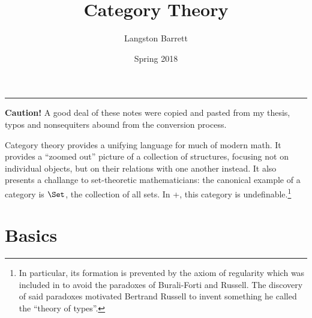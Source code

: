 \documentclass[a5paper]{article}
\begin{document}
\title{Category Theory}
\author{Langston Barrett}
\date{Spring 2018}
\maketitle
\tableofcontents
\vspace{1em}
\hrule
\vspace{1em}

\textbf{Caution!} A good deal of these notes were copied and pasted from my thesis, 
typos and nonsequiters abound from the conversion process.

Category theory provides a unifying language for much of modern math. It
provides a ``zoomed out'' picture of a collection of structures, focusing not on
individual objects, but on their relations with one another instead. 
It also presents a challange to set-theoretic mathematicians: the
canonical example of a category is $\Set$, the collection of all sets. In
\ZFC{}+\FOL{}, this category is undefinable.\footnote{In
  particular, its formation is prevented by the axiom of regularity
  which was included in \ZFC{} to avoid the
  paradoxes of Burali-Forti and Russell. The discovery of said paradoxes
  motivated Bertrand Russell to invent something he called the ``theory of
  types''.}

\section{Basics}
\label{sec:basics}

\end{document}
